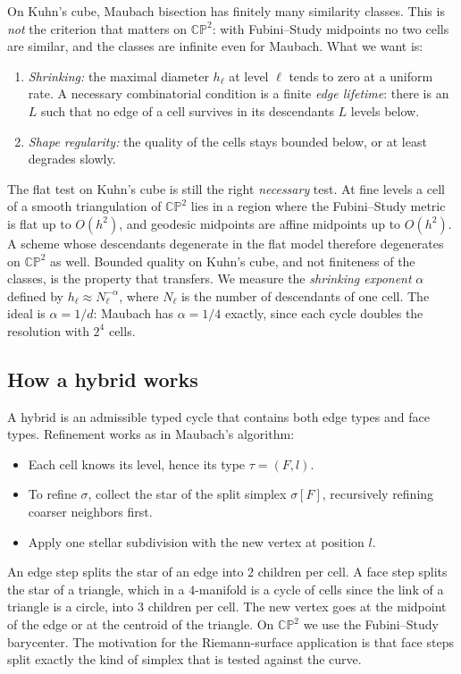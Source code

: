 \documentclass[11pt]{article}
\theoremstyle{plain}
\theoremstyle{definition}
\theoremstyle{remark}
\newcommand{\CP}{\mathbb{CP}}
\begin{document}
On Kuhn's cube, Maubach bisection has finitely many similarity classes.
This is \emph{not} the criterion that matters on $\CP^2$: with
Fubini--Study midpoints no two cells are similar, and the classes are
infinite even for Maubach. What we want is:
\begin{enumerate}[label=(G\arabic*)]
\item \emph{Shrinking:} the maximal diameter $h_\ell$ at level $\ell$ tends
  to zero at a uniform rate. A necessary combinatorial condition is a
  finite \emph{edge lifetime}: there is an $L$ such that no edge of a
  cell survives in its descendants $L$ levels below.
\item \emph{Shape regularity:} the quality of the cells stays bounded
  below, or at least degrades slowly.
\end{enumerate}
The flat test on Kuhn's cube is still the right \emph{necessary} test. At
fine levels a cell of a smooth triangulation of $\CP^2$ lies in a region
where the Fubini--Study metric is flat up to $O(h^2)$, and geodesic
midpoints are affine midpoints up to $O(h^2)$. A scheme whose descendants
degenerate in the flat model therefore degenerates on $\CP^2$ as well.
Bounded quality on Kuhn's cube, and not finiteness of the classes, is the
property that transfers. We measure the \emph{shrinking exponent}
$\alpha$ defined by $h_\ell\approx N_\ell^{-\alpha}$, where $N_\ell$ is the
number of descendants of one cell. The ideal is $\alpha=1/d$: Maubach has
$\alpha=1/4$ exactly, since each cycle doubles the resolution with
$2^4$ cells.

\subsection{How a hybrid works}

A hybrid is an admissible typed cycle that contains both edge types and
face types. Refinement works as in Maubach's algorithm:
\begin{itemize}
\item Each cell knows its level, hence its type $\tau=(F,l)$.
\item To refine $\sigma$, collect the star of the split simplex
  $\sigma[F]$, recursively refining coarser neighbors first.
\item Apply one stellar subdivision with the new vertex at position $l$.
\end{itemize}
An edge step splits the star of an edge into $2$ children per cell. A
face step splits the star of a triangle, which in a $4$-manifold is a
cycle of cells since the link of a triangle is a circle, into $3$
children per cell. The new vertex goes at the midpoint of the edge or at
the centroid of the triangle. On $\CP^2$ we use the Fubini--Study
barycenter. The motivation for the Riemann-surface application is that
face steps split exactly the kind of simplex that is tested against the
curve.
\end{document}
